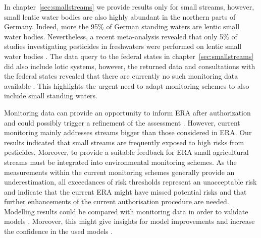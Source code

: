 In chapter~\ref{sec:smallstreams} we provide results only for small streams, however, small lentic water bodies are also highly abundant in the northern parts of Germany.
Indeed, more the 95\% of German standing waters are lentic small water bodies.
Nevertheless, a recent meta-analysis revealed that only 5\% of studies investigating pesticides in freshwaters were performed on lentic small water bodies \citep{lorenz_specifics_2016}.
The data query to the federal states in chapter~\ref{sec:smallstreams} did also include lotic systems, however, the returned data and consultations with the federal states revealed that there are currently no such monitoring data available \citep{brinke_umsetzung_2016}. 
This highlights the urgent need to adapt monitoring schemes to also include small standing waters.

Monitoring data can provide an opportunity to inform ERA after authorization and could possibly trigger a refinement of the assessment \citep{knauer_pesticides_2016}. 
However, current monitoring mainly addresses streams bigger than those considered in ERA.
Our results indicated that small streams are frequently exposed to high risks from pesticides.
Moreover, to provide a suitable feedback for ERA small agricultural streams must be integrated into environmental monitoring schemes. 
As the measurements within the current monitoring schemes generally provide an underestimation, all exceedances of risk thresholds represent an unacceptable risk and indicate that the current ERA might have missed potential risks and that further enhancements of the current authorisation procedure are needed.
Modelling results could be compared with monitoring data in order to validate models \citep{knabel_fungicide_2014}.
Moreover, this might give insights for model improvements and increase the confidence in the used models \citep{gitzen_design_2012}.

